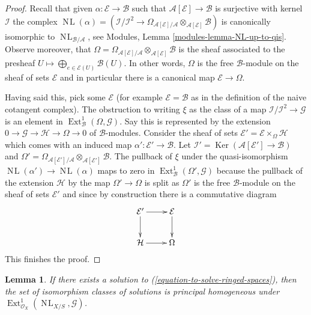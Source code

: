 \documentclass{stacks-project}
\theoremstyle{plain}
\newtheorem{lemma}[subsection]{Lemma}
\theoremstyle{definition}
\theoremstyle{remark}
\numberwithin{equation}{subsection}
\def\Ext{\mathop{\mathrm{Ext}}\nolimits}
\def\NL{\mathop{N\!L}\nolimits}
\def\Ker{\mathop{\mathrm{Ker}}}
\begin{document}
\begin{proof}
Recall that given $\alpha : \mathcal{E} \to \mathcal{B}$
such that $\mathcal{A}[\mathcal{E}] \to \mathcal{B}$ is surjective
with kernel $\mathcal{I}$ the complex
$\NL(\alpha) = (\mathcal{I}/\mathcal{I}^2 \to 
\Omega_{\mathcal{A}[\mathcal{E}]/\mathcal{A}}
\otimes_{\mathcal{A}[\mathcal{E}]} \mathcal{B})$ is canonically
isomorphic to $\NL_{\mathcal{B}/\mathcal{A}}$, see
Modules, Lemma \ref{modules-lemma-NL-up-to-qis}.
Observe moreover, that
$\Omega = \Omega_{\mathcal{A}[\mathcal{E}]/\mathcal{A}}
\otimes_{\mathcal{A}[\mathcal{E}]} \mathcal{B}$ is the sheaf
associated to the presheaf
$U \mapsto \bigoplus_{e \in \mathcal{E}(U)} \mathcal{B}(U)$.
In other words, $\Omega$ is the free $\mathcal{B}$-module on the
sheaf of sets $\mathcal{E}$ and in particular there is a canonical
map $\mathcal{E} \to \Omega$.

\medskip\noindent
Having said this, pick some $\mathcal{E}$ (for example
$\mathcal{E} = \mathcal{B}$ as in the definition of the naive cotangent
complex). The obstruction to writing $\xi$ as the class of a map
$\mathcal{I}/\mathcal{I}^2 \to \mathcal{G}$ is an element in
$\Ext^1_\mathcal{B}(\Omega, \mathcal{G})$. Say this is represented
by the extension $0 \to \mathcal{G} \to \mathcal{H} \to \Omega \to 0$
of $\mathcal{B}$-modules. Consider the sheaf of sets
$\mathcal{E}' = \mathcal{E} \times_\Omega \mathcal{H}$
which comes with an induced map $\alpha' : \mathcal{E}' \to \mathcal{B}$.
Let $\mathcal{I}' = \Ker(\mathcal{A}[\mathcal{E}'] \to \mathcal{B})$
and $\Omega' = \Omega_{\mathcal{A}[\mathcal{E}']/\mathcal{A}}
\otimes_{\mathcal{A}[\mathcal{E}']} \mathcal{B}$.
The pullback of $\xi$ under the quasi-isomorphism
$\NL(\alpha') \to \NL(\alpha)$ maps to zero in
$\Ext^1_\mathcal{B}(\Omega', \mathcal{G})$
because the pullback of the extension $\mathcal{H}$
by the map $\Omega' \to \Omega$ is split as $\Omega'$ is the free
$\mathcal{B}$-module on the sheaf of sets $\mathcal{E}'$ and since
by construction there is a commutative diagram
$$
\xymatrix{
\mathcal{E}' \ar[r] \ar[d] & \mathcal{E} \ar[d] \\
\mathcal{H} \ar[r] & \Omega
}
$$
This finishes the proof.
\end{proof}

\begin{lemma}
\label{lemma-choices-ringed-spaces}
If there exists a solution to (\ref{equation-to-solve-ringed-spaces}),
then the set of isomorphism classes of solutions is principal homogeneous
under $\Ext^1_{\mathcal{O}_X}(\NL_{X/S}, \mathcal{G})$.
\end{lemma}
\end{document}
